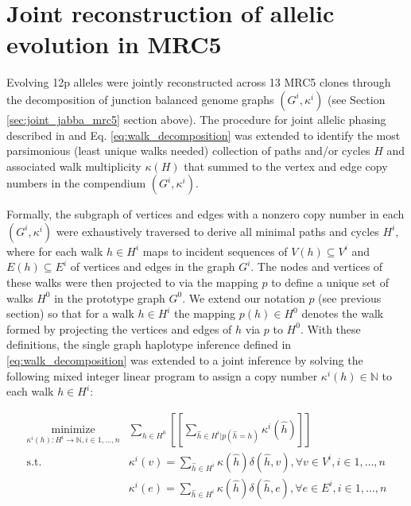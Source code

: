 \documentclass[phd,tocprelim]{cornell}
\begin{document}
\section{Joint reconstruction of allelic evolution in MRC5} \label{sec:tc_joint_jabba}
Evolving 12p alleles were jointly reconstructed across 13 MRC5 clones through the decomposition of junction balanced genome graphs $(G^i,κ^i)$ (see Section \ref{sec:joint_jabba_mrc5} section above). The procedure for joint allelic phasing described in \cite{Hadi2020-um} and Eq. \ref{eq:walk_decomposition} was extended to identify the most parsimonious (least unique walks needed) collection of paths and/or cycles $H$ and associated walk multiplicity $\kappa(H)$ that summed to the vertex and edge copy numbers in the compendium $(G^i,κ^i)$.

Formally, the subgraph of vertices and edges with a nonzero copy number in each $(G^i,κ^i)$ were exhaustively traversed to derive all minimal paths and cycles $H^i$, where for each walk $h \in H^i$ maps to incident sequences of $V(h) \subseteq V^i$ and $E(h) \subseteq E^i$ of vertices and edges in the graph $G^i$.  The nodes and vertices of these walks were then projected to via the mapping $p$ to define a unique set of walks $H^0$ in the prototype graph $G^0$. We extend our notation $p$ (see previous section) so that for a walk $h \in H^i$ the mapping $p(h) \in H^0$ denotes the walk formed by projecting the vertices and edges of $h$ via $p$ to $H^0$.  With these definitions, the single graph haplotype inference defined in \ref{eq:walk_decomposition} was extended to a joint inference by solving the following mixed integer linear program to assign a copy number $\kappa^i(h) \in \mathbb{N}$ to each walk $h \in H^i$:

\begin{equation} \label{eq:joint_walk_decomposition}
    \begin{aligned}
        \underset{\kappa^i(h):H^i \rightarrow \mathbb{N}, i \in 1, \dots, n}{\text{minimize}} & \sum_{h \in H^0} [\![ \sum_{\hat{h} \in H^i | p(\hat{h} = h)} \kappa^i(\hat{h}) ]\!] \\
        \text{s.t. } & \kappa^i(v) = \sum_{\hat{h} \in H^i} \kappa(\hat{h})\delta(\hat{h}, v), \forall v \in V^i, i \in 1, \dots, n \\
        & \kappa^i(e) = \sum_{\hat{h} \in H^i} \kappa(\hat{h})\delta(\hat{h}, e), \forall e \in E^i, i \in 1, \dots, n
    \end{aligned}
\end{equation}
\end{document}

